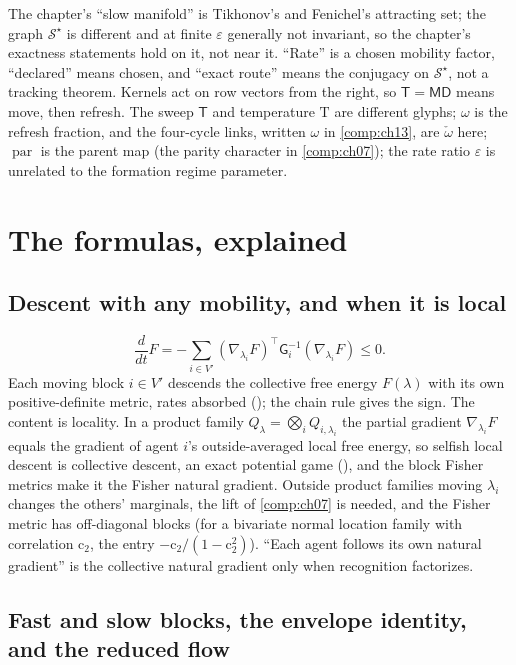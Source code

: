 The chapter's ``slow manifold'' is Tikhonov's and Fenichel's attracting set; the graph
$\mathcal S^\star$ is different and at finite $\varepsilon$ generally not invariant, so the chapter's
exactness statements hold on it, not near it. ``Rate'' is a chosen mobility factor, ``declared'' means
chosen, and ``exact route'' means the conjugacy on $\mathcal S^\star$, not a tracking theorem. Kernels
act on row vectors from the right, so $\mathsf T=\mathsf M\mathsf D$ means move, then refresh. The
sweep $\mathsf T$ and temperature $\mathrm T$ are different glyphs; $\omega$ is the refresh fraction,
and the four-cycle links, written $\omega$ in \cref{comp:ch13}, are $\check\omega$ here;
$\operatorname{par}$ is the parent map (the parity character in \cref{comp:ch07}); the rate ratio
$\varepsilon$ is unrelated to the formation regime parameter.

\section{The formulas, explained}
\label{comp:ch08-formulas}

\subsection{Descent with any mobility, and when it is local}
\label{comp:ch08-formulas-descent}

\[
\frac{d}{dt}F=-\sum_{i\in V'}(\nabla_{\lambda_i}F)^\top\mathsf G_i^{-1}(\nabla_{\lambda_i}F)\leq0 .
\]
Each moving block $i\in V'$ descends the collective free energy $F(\lambda)$ with its own
positive-definite metric, rates absorbed (); the chain rule gives the
sign. The content is locality. In a product family $Q_\lambda=\bigotimes_iQ_{i,\lambda_i}$ the partial
gradient $\nabla_{\lambda_i}F$ equals the gradient of agent $i$'s outside-averaged local free energy,
so selfish local descent is collective descent, an exact potential game
(), and the block Fisher metrics make it the Fisher natural
gradient. Outside product families moving $\lambda_i$ changes the others' marginals, the lift of
\cref{comp:ch07} is needed, and the Fisher metric has off-diagonal blocks (for a bivariate normal
location family with correlation $\mathrm c_2$, the entry $-\mathrm c_2/(1-\mathrm c_2^2)$). ``Each
agent follows its own natural gradient'' is the collective natural gradient only when recognition
factorizes.

\subsection{Fast and slow blocks, the envelope identity, and the reduced flow}
\label{comp:ch08-formulas-envelope}

